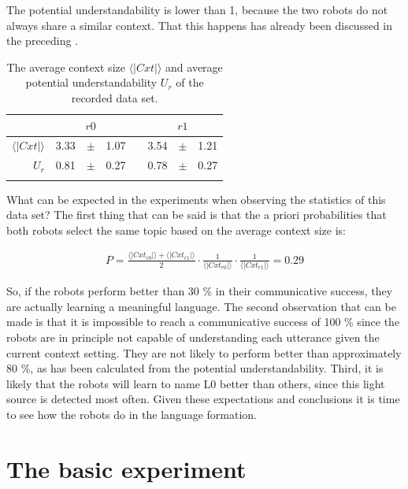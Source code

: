 The potential understandability is lower than 1, because the two robots do not always share a similar context. That this happens has already been discussed in the preceding .

\begin{table}[t]
\centering
\begin{tabular}{rd{3}@{~}c@{~}d{3}c@{~}d{3}@{~}c@{~}d{3}}
\lsptoprule
 &  & & \\\midrule
$\langle|Cxt|\rangle$ & 3.33 & $\pm$ & 1.07 & & 3.54 & $\pm$ & 1.21\\
$U_r$ & 0.81 & $\pm$ & 0.27 & & 0.78 & $\pm$ & 0.27\\
\lspbottomrule
\end{tabular}
\caption{The average context size $\langle|Cxt|\rangle$ and average potential understandability $U_r$ of the recorded data set.}
\label{t:st:data}
\end{table}


What can be expected in the experiments when observing the statistics of this data set? The first thing that can be said is that the a priori probabilities that both robots select the same topic based on the average context size is:

\begin{eqnarray*}
P=\frac{\langle|Cxt_{r0}|\rangle+\langle|Cxt_{r1}|\rangle}{2}\cdot \frac{1}{\langle|Cxt_{r0}|\rangle} \cdot \frac{1}{\langle|Cxt_{r1}|\rangle}=0.29
\end{eqnarray*}


So, if the robots perform better than 30 \% in their communicative success, they are actually learning a meaningful language. The second observation that can be made is that it is impossible to reach a communicative success of 100 \% since the robots are in principle not capable of understanding each utterance given the current context setting. They are not likely to perform better than approximately 80 \%, as has been calculated from the potential understandability. Third, it is likely that the robots will learn to name L0 better than others, since this light source is detected most often. Given these expectations and conclusions it is time to see how the robots do in the language formation.


\section{The basic experiment}\label{s:st:experiment}

